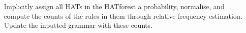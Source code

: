\documentclass[letterpaper,10pt,english]{sphinxmanual}
\begin{document}
\begin{fulllineitems}
\begin{fulllineitems}
\end{fulllineitems}


\begin{fulllineitems}
\label{process_hats:process_hats.HATGrammar.update_weights}
Implicitly assign all HATs in the HATforest a probability,
normalise, and compute the counts of the rules in them
through relative frequency estimation.
Update the inputted grammar with these counts.

\end{fulllineitems}


\end{fulllineitems}

\end{document}
